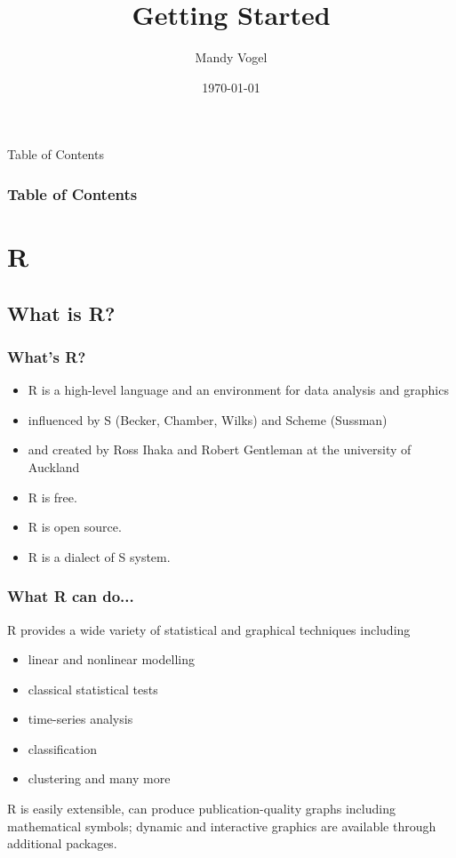 \documentclass[xcolor={table},c]{beamer}
\begin{document}
\title{Getting Started}   
\author{Mandy Vogel} 
\date{\today}


\begin{frame}
\titlepage
\end{frame}

\begin{frame}{Table of Contents}
\frametitle{Table of Contents}\tableofcontents
\end{frame}

\section{R}
\subsection{What is R?}

\begin{frame}\frametitle{What's R?}
  \begin{itemize}
    \item R is a high-level language and an environment for data analysis and graphics
    \item influenced by S (Becker, Chamber, Wilks) and Scheme (Sussman)
    \item and created by Ross Ihaka and Robert Gentleman at the university of Auckland
    \item R is free.
    \item R is open source.
    \item R is a dialect of S system.
  \end{itemize}
\end{frame}

\begin{frame}\frametitle{What R can do...}
  R provides a wide variety of statistical and graphical techniques including
  \begin{itemize}
    \item linear and nonlinear modelling
    \item classical statistical tests
    \item time-series analysis
    \item classification
    \item clustering and many more
  \end{itemize} \pause
    R is easily extensible, can produce publication-quality graphs including mathematical symbols; dynamic and interactive graphics are available through additional packages.
\end{frame}
\end{document}
